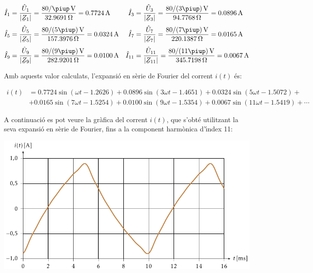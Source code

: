 \begin{exemple}
    \begin{align*}
        \hat{I}_1 &= \frac{\hat{U}_1}{|\cmplx{Z}_1|} = \frac{80/\piup\unit{V}}{\SI{32,9691}{\ohm}} = \SI{0,7724}{A}
        & \hat{I}_3 &= \frac{\hat{U}_3}{|\cmplx{Z}_3|} =\frac{80/(3\piup)\unit{V}}{\SI{94,7768}{\ohm}} = \SI{0,0896}{A}\\[0.5ex]
        \hat{I}_5 &= \frac{\hat{U}_5}{|\cmplx{Z}_5|} =\frac{80/(5\piup)\unit{V}}{\SI{157,3976}{\ohm}} =\SI{0,0324}{A}
        & \hat{I}_7 &= \frac{\hat{U}_7}{|\cmplx{Z}_7|} =\frac{80/(7\piup)\unit{V}}{\SI{220,1387}{\ohm}} =
        \SI{0,0165}{A}\\[0.5ex]
        \hat{I}_9 &= \frac{\hat{U}_9}{|\cmplx{Z}_9|} =\frac{80/(9\piup)\unit{V}}{\SI{282,9201}{\ohm}} =
        \SI{0,0100}{A} & \hat{I}_{11} &= \frac{\hat{U}_{11}}{|\cmplx{Z}_{11}|} =\frac{80/(11\piup)\unit{V}}
        {\SI{345,7198}{\ohm}} =  \SI{0,0067}{A}
    \end{align*}

    Amb aquests valor calculats, l'expansi\'{o} en s\`{e}rie de Fourier del
    corrent $i(t)$ \'{e}s:

    \[\begin{split}
         i(t) &=  \num{0,7724} \sin(\omega t - \num{1,2626}) +  \num{0,0896} \sin(3 \omega t -
         \num{1,4651}) + \num{0,0324} \sin(5 \omega t - \num{1,5072}) +{}\\
         &+ \num{0,0165} \sin(7 \omega t - \num{1,5254}) + \num{0,0100} \sin(9 \omega t - \num{1,5354})
         + \num{0,0067} \sin(11 \omega t - \num{1,5419}) +\cdots
    \end{split}\]

    A continuaci\'{o} es pot veure la gr\`{a}fica del corrent $i(t)$, que s'obt\'{e}
    utilitzant la seva expansi\'{o} en s\`{e}rie de Fourier, fins a la component
    harm\`{o}nica d'\'{\i}ndex 11:

    \begin{center}
    \centering
      \includegraphics{Imatges/Cap-Fourier-Exemple-Corrent.pdf}
    \end{center}


\end{exemple}
